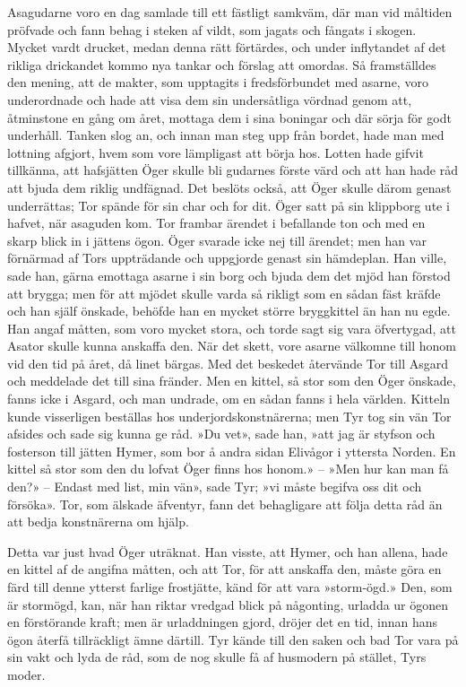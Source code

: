 Asagudarne voro en dag samlade till ett fästligt samkväm, där man vid
måltiden pröfvade och fann behag i steken af vildt, som jagats och
fångats i skogen. Mycket vardt drucket, medan denna rätt förtärdes, och
under inflytandet af det rikliga drickandet kommo nya tankar och förslag
att omordas. Så framställdes den mening, att de makter, som upptagits i
fredsförbundet med asarne, voro underordnade och hade att visa dem sin
undersåtliga vördnad genom att, åtminstone en gång om året, mottaga dem
i sina boningar och där sörja för godt underhåll. Tanken slog an, och
innan man steg upp från bordet, hade man med lottning afgjort, hvem som
vore lämpligast att börja hos. Lotten hade gifvit tillkänna, att
hafsjätten Öger skulle bli gudarnes förste värd och att han hade råd att
bjuda dem riklig undfägnad. Det beslöts också, att Öger skulle därom
genast underrättas; Tor spände för sin char och for dit. Öger satt på
sin klippborg ute i hafvet, när asaguden kom. Tor frambar ärendet i
befallande ton och med en skarp blick in i jättens ögon. Öger svarade
icke nej till ärendet; men han var förnärmad af Tors uppträdande och
uppgjorde genast sin hämdeplan. Han ville, sade han, gärna emottaga
asarne i sin borg och bjuda dem det mjöd han förstod att brygga; men för
att mjödet skulle varda så rikligt som en sådan fäst kräfde och han
själf önskade, behöfde han en mycket större bryggkittel än han nu egde.
Han angaf måtten, som voro mycket stora, och torde sagt sig vara
öfvertygad, att Asator skulle kunna anskaffa den. När det skett, vore
asarne välkomne till honom vid den tid på året, då linet bärgas. Med det
beskedet återvände Tor till Asgard och meddelade det till sina fränder.
Men en kittel, så stor som den Öger önskade, fanns icke i Asgard, och
man undrade, om en sådan fanns i hela världen. Kitteln kunde visserligen
beställas hos underjordskonstnärerna;
men Tyr tog sin vän Tor afsides och sade sig kunna ge råd. »Du vet»,
sade han, »att jag är styfson och fosterson till jätten Hymer, som bor å
andra sidan Elivågor i yttersta Norden. En kittel så stor som den du
lofvat Öger finns hos honom.» -- »Men hur kan man få den?» -- Endast med
list, min vän», sade Tyr; »vi måste begifva oss dit och försöka». Tor,
som älskade äfventyr, fann det behagligare att följa detta råd än att
bedja konstnärerna om hjälp.

Detta var just hvad Öger uträknat. Han visste, att Hymer, och han
allena, hade en kittel af de angifna måtten, och att Tor, för att
anskaffa den, måste göra en färd till denne ytterst farlige frostjätte,
känd för att vara »storm-ögd.» Den, som är stormögd, kan, när han riktar
vredgad blick på någonting, urladda ur ögonen en förstörande kraft; men
är urladdningen gjord, dröjer det en tid, innan hans ögon återfå
tillräckligt ämne därtill. Tyr kände till den saken och bad Tor vara på
sin vakt och lyda de råd, som de nog skulle få af husmodern på stället,
Tyrs moder.

